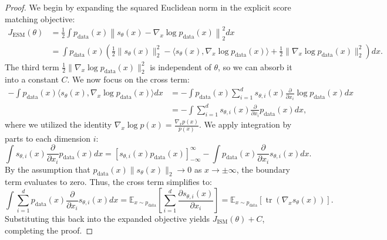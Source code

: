 \begin{proof}
We begin by expanding the squared Euclidean norm in the explicit score matching objective:
\begin{align*}
    J_{\text{ESM}}(\theta) &= \frac{1}{2} \int p_{\text{data}}(x) \left\| s_\theta(x) - \nabla_x \log p_{\text{data}}(x) \right\|_2^2 dx \\
    &= \int p_{\text{data}}(x) \left( \frac{1}{2}\|s_\theta(x)\|_2^2 - \langle s_\theta(x), \nabla_x \log p_{\text{data}}(x) \rangle + \frac{1}{2}\|\nabla_x \log p_{\text{data}}(x)\|_2^2 \right) dx.
\end{align*}
The third term $\frac{1}{2}\|\nabla_x \log p_{\text{data}}(x)\|_2^2$ is independent of $\theta$, so we can absorb it into a constant $C$. We now focus on the cross term:
\begin{align*}
    -\int p_{\text{data}}(x) \langle s_\theta(x), \nabla_x \log p_{\text{data}}(x) \rangle dx &= -\int p_{\text{data}}(x) \sum_{i=1}^d s_{\theta, i}(x) \frac{\partial}{\partial x_i} \log p_{\text{data}}(x) dx \\
    &= -\int \sum_{i=1}^d s_{\theta, i}(x) \frac{\partial}{\partial x_i} p_{\text{data}}(x) dx,
\end{align*}
where we utilized the identity $\nabla_x \log p(x) = \frac{\nabla_x p(x)}{p(x)}$.
We apply integration by parts to each dimension $i$:
\begin{equation}
    \int s_{\theta, i}(x) \frac{\partial}{\partial x_i} p_{\text{data}}(x) dx = \left[ s_{\theta, i}(x) p_{\text{data}}(x) \right]_{-\infty}^{\infty} - \int p_{\text{data}}(x) \frac{\partial}{\partial x_i} s_{\theta, i}(x) dx.
\end{equation}
By the assumption that $p_{\text{data}}(x) \|s_\theta(x)\|_2 \to 0$ as $x \to \pm\infty$, the boundary term evaluates to zero. Thus, the cross term simplifies to:
\begin{equation}
    \int \sum_{i=1}^d p_{\text{data}}(x) \frac{\partial}{\partial x_i} s_{\theta, i}(x) dx = \mathbb{E}_{x \sim p_{\text{data}}} \left[ \sum_{i=1}^d \frac{\partial s_{\theta, i}(x)}{\partial x_i} \right] = \mathbb{E}_{x \sim p_{\text{data}}} \left[ \operatorname{tr}(\nabla_x s_\theta(x)) \right].
\end{equation}
Substituting this back into the expanded objective yields $J_{\text{ISM}}(\theta) + C$, completing the proof.
\end{proof}

